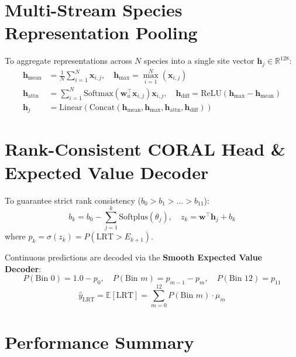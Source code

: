 \documentclass[11pt,a4paper]{article}
\begin{document}
\section{Multi-Stream Species Representation Pooling}

To aggregate representations across $N$ species into a single site vector $\mathbf{h}_j \in \mathbb{R}^{128}$:
\begin{align}
\mathbf{h}_{\text{mean}} &= \frac{1}{N} \sum_{i=1}^N \mathbf{x}_{i,j}, \quad \mathbf{h}_{\text{max}} = \max_{i=1}^N (\mathbf{x}_{i,j}) \\
\mathbf{h}_{\text{attn}} &= \sum_{i=1}^N \text{Softmax}\left(\mathbf{w}_a^\top \mathbf{x}_{i,j}\right) \mathbf{x}_{i,j}, \quad \mathbf{h}_{\text{diff}} = \text{ReLU}\left(\mathbf{h}_{\text{max}} - \mathbf{h}_{\text{mean}}\right) \\
\mathbf{h}_j &= \text{Linear}\left(\text{Concat}\left(\mathbf{h}_{\text{mean}}, \mathbf{h}_{\text{max}}, \mathbf{h}_{\text{attn}}, \mathbf{h}_{\text{diff}}\right)\right)
\end{align}

\section{Rank-Consistent CORAL Head \& Expected Value Decoder}

To guarantee strict rank consistency ($b_0 > b_1 > \dots > b_{11}$):
\begin{equation}
b_k = b_0 - \sum_{j=1}^k \text{Softplus}(\theta_j), \quad z_k = \mathbf{w}^\top \mathbf{h}_j + b_k
\end{equation}
where $p_k = \sigma(z_k) = P(\text{LRT} > E_{k+1})$.

Continuous predictions are decoded via the \textbf{Smooth Expected Value Decoder}:
\begin{equation}
P(\text{Bin } 0) = 1.0 - p_0, \quad P(\text{Bin } m) = p_{m-1} - p_m, \quad P(\text{Bin } 12) = p_{11}
\end{equation}
\begin{equation}
\hat{y}_{\text{LRT}} = \mathbb{E}[\text{LRT}] = \sum_{m=0}^{12} P(\text{Bin } m) \cdot \mu_m
\end{equation}

\section{Performance Summary}
\end{document}
